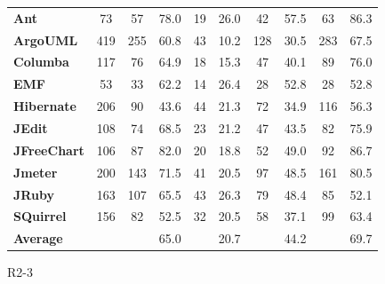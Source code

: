 {\begin{table}[!thb]
\begin{center}
\begin{tabular}{l| c c c c c c c c c}
        \textbf{Ant}            & 73  & 57   & 78.0  & 19 & 26.0  & 42  & 57.5 & 63  & 86.3   \\
        \textbf{ArgoUML}        & 419 & 255  & 60.8  & 43 & 10.2  & 128 & 30.5 & 283 & 67.5   \\
        \textbf{Columba}        & 117 & 76   & 64.9  & 18 & 15.3  & 47  & 40.1 & 89  & 76.0   \\
        \textbf{EMF}            & 53  & 33   & 62.2  & 14 & 26.4  & 28  & 52.8 & 28  & 52.8   \\
        \textbf{Hibernate}      & 206 & 90   & 43.6  & 44 & 21.3  & 72  & 34.9 & 116 & 56.3   \\
        \textbf{JEdit}          & 108 & 74   & 68.5  & 23 & 21.2  & 47  & 43.5 & 82  & 75.9   \\
        \textbf{JFreeChart}     & 106 & 87   & 82.0  & 20 & 18.8  & 52  & 49.0 & 92  & 86.7   \\
        \textbf{Jmeter}         & 200 & 143  & 71.5  & 41 & 20.5  & 97  & 48.5 & 161 & 80.5   \\
        \textbf{JRuby}          & 163 & 107  & 65.5  & 43 & 26.3  & 79  & 48.4 & 85  & 52.1   \\
        \textbf{SQuirrel}       & 156 & 82   & 52.5  & 32 & 20.5  & 58  & 37.1 & 99  & 63.4   \\
        \midrule
        \textbf{Average}        &     &      & 65.0  &    & 20.7  &     & 44.2 &     & 69.7  \\

        \bottomrule
        \end{tabular}
    \end{center}
\end{table} 

}{R2-3}